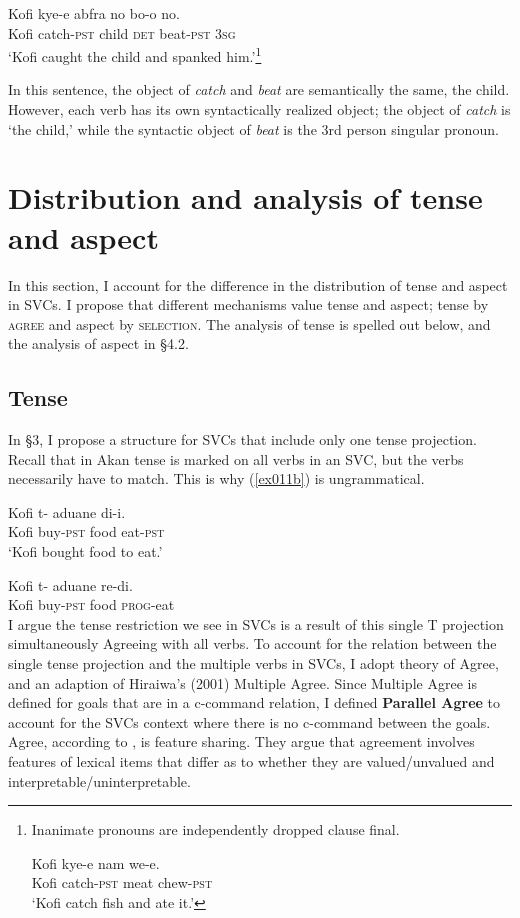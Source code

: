 \documentclass[output=paper,
modfonts
]{langscibook}
\begin{document}
\ea \label{ex28}  \gll  Kofi kye-e abfra no bo-o no.\\
	Kofi catch-\textsc{pst} child \textsc{det} beat-\textsc{pst} 3\textsc{sg}\\
\glt`Kofi caught the child and spanked him.'\footnote{Inanimate pronouns are independently dropped clause final.

\ea \gll  Kofi kye-e nam we-e.\\
	Kofi catch-\textsc{pst} meat chew-\textsc{pst}\\
\glt`Kofi catch fish and ate it.'
\z }

\z In this sentence, the object of \emph{catch} and \emph{beat} are semantically the same, the child. However, each verb has its own syntactically realized object; the object of \emph{catch} is `the child,' while the syntactic object of \emph{beat} is the 3rd person singular pronoun. 

 
\section{Distribution and analysis of tense and aspect} 
In this section, I account for the difference in the distribution of tense and aspect in SVCs. I propose that different mechanisms value tense and aspect;   tense by \textsc{agree}  and aspect by \textsc{selection}. The analysis of tense is spelled out below, and the analysis of aspect in \S4.2. 

\subsection{Tense}
In \S3, I propose a structure for SVCs that include only one tense projection.  Recall that in Akan tense is marked on all verbs in an SVC, but the verbs necessarily have to match. This is why (\ref{ex011b}) is ungrammatical. 

\ea \label{ex011}
\ea \label{ex011a} \gll Kofi t- aduane di-i.\\
	Kofi buy-\textsc{pst} food eat-\textsc{pst}\\
	\glt `Kofi bought food to eat.'
    
    \ex\label{ex011b} \gll * Kofi t- aduane re-di.\\
	{} Kofi buy-\textsc{pst} food \textsc{prog}-eat\\
	
 \z \z I argue the tense restriction we see in SVCs is a result of this single T projection simultaneously Agreeing with all verbs. To account for the relation between the single tense projection and the multiple verbs in SVCs, I adopt  theory of Agree, and an adaption of Hiraiwa's (2001) Multiple Agree. Since Multiple Agree is defined for goals that are in a c-command relation, I defined  \textbf{Parallel Agree} to account for the SVCs context where there is no c-command between the goals.\\ Agree, according to \citet{PesetskyTorrego2007},  is feature sharing. They argue that agreement involves features of lexical items that differ as to whether they are valued/unvalued and interpretable/uninterpretable.  
  
\end{document}
